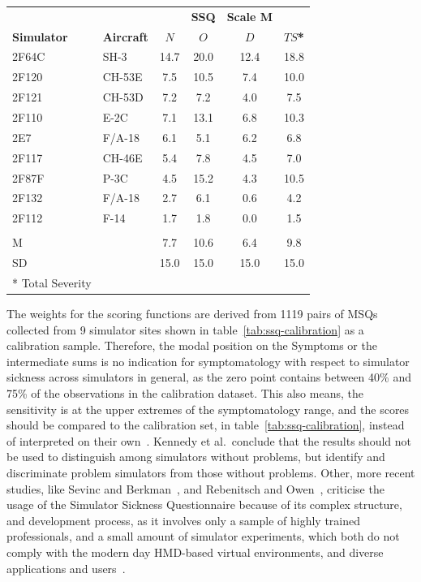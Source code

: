 \begin{center}
    \begin{tabular}{ l l c c c c}
        \toprule
         & & & \textbf{SSQ} & \textbf{Scale M} & \\
        \textbf{Simulator} & \textbf{Aircraft} & \textbf{$N$} & \textbf{$O$} & \textbf{$D$} & \textbf{$TS$*} \\
        \midrule
        2F64C & SH-3   & 14.7 & 20.0 & 12.4 & 18.8 \\
        2F120 & CH-53E & 7.5  & 10.5 & 7.4  & 10.0 \\
        2F121 & CH-53D & 7.2  & 7.2  & 4.0  & 7.5  \\
        2F110 & E-2C   & 7.1  & 13.1 & 6.8  & 10.3 \\
        2E7   & F/A-18 & 6.1  & 5.1  & 6.2  & 6.8  \\
        2F117 & CH-46E & 5.4  & 7.8  & 4.5  & 7.0  \\
        2F87F & P-3C   & 4.5  & 15.2 & 4.3  & 10.5 \\
        2F132 & F/A-18 & 2.7  & 6.1  & 0.6  & 4.2  \\
        2F112 & F-14   & 1.7  & 1.8  & 0.0  & 1.5  \\
              &        &      &      &      &      \\
        M     &        & 7.7  & 10.6 & 6.4  & 9.8  \\
        SD    &        & 15.0 & 15.0 & 15.0 & 15.0 \\
        \bottomrule
        * Total Severity & & & & & \\
    \end{tabular}
    \label{tab:ssq-calibration}
\end{center}
The weights for the scoring functions are derived from 1119 pairs of MSQs collected from 9 simulator sites
shown in table~\ref{tab:ssq-calibration} as a calibration sample.
Therefore, the modal position on the Symptoms or the intermediate sums is no indication for symptomatology with
respect to simulator sickness across simulators in general, as the zero point contains between 40\% and 75\% of the
observations in the calibration dataset.
This also means, the sensitivity is at the upper extremes of the symptomatology range, and the scores should be
compared to the calibration set, in table~\ref{tab:ssq-calibration}, instead of
interpreted on their own~\cite{Kennedy1993}.
Kennedy et al.\ conclude that the results should not be used to distinguish among simulators without problems, but
identify and discriminate problem simulators from those without problems.
Other, more recent studies, like Sevinc and Berkman~\cite{Sevinc2020}, and Rebenitsch and Owen~\cite{Rebenitsch2016},
criticise the usage of the Simulator Sickness Questionnaire because of its complex structure, and development
process, as it involves only a sample of highly trained professionals, and a small amount of simulator experiments,
which both do not comply with the modern day HMD-based virtual environments, and diverse applications
and users~\cite{Sevinc2020}.

